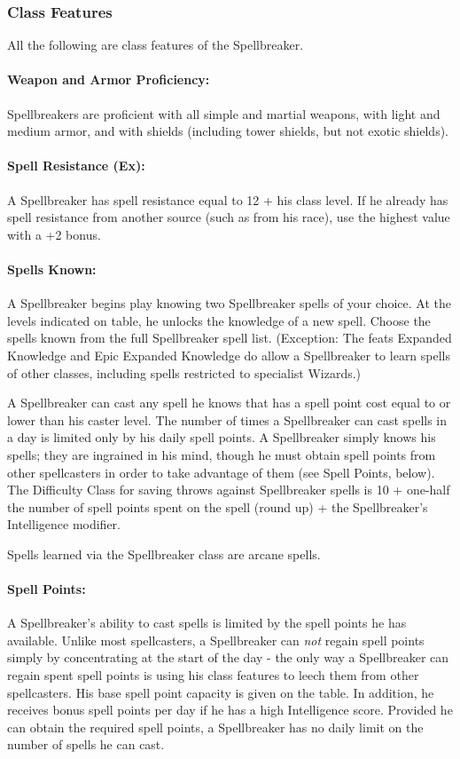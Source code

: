 \subsubsection{Class Features}
All the following are class features of the Spellbreaker.

\paragraph{Weapon and Armor Proficiency:} 
Spellbreakers are proficient with all simple and martial weapons, with light and medium armor, and with shields (including tower shields, but not exotic shields).

\paragraph{Spell Resistance (Ex):} A Spellbreaker has spell resistance equal to 12 + his class level. If he already has spell resistance from another source (such as from his race), use the highest value with a +2 bonus.

\paragraph{Spells Known:} A Spellbreaker begins play knowing two Spellbreaker spells of your choice.
At the levels indicated on  table, he unlocks the knowledge of a new spell.
Choose the spells known from the full Spellbreaker spell list.
(Exception: The feats Expanded Knowledge and Epic Expanded Knowledge do allow a Spellbreaker to learn spells of other classes, including spells restricted to specialist Wizards.) 

A Spellbreaker can cast any spell he knows that has a spell point cost equal to or lower than his caster level.
The number of times a Spellbreaker can cast spells in a day is limited only by his daily spell points. 
A Spellbreaker simply knows his spells; they are ingrained in his mind, though he must obtain spell points from other spellcasters in order to take advantage of them (see Spell Points, below).
The Difficulty Class for saving throws against Spellbreaker spells is 10 + one-half the number of spell points spent on the spell (round up) + the Spellbreaker's Intelligence modifier.

Spells learned via the Spellbreaker class are arcane spells.
\paragraph{Spell Points:} A Spellbreaker's ability to cast spells is limited by the spell points he has available. 
Unlike most spellcasters, a Spellbreaker can \emph{not} regain spell points simply by concentrating at the start of the day - the only way a Spellbreaker can regain spent spell points is using his class features to leech them from other spellcasters.
His base spell point capacity is given on the  table. In addition, he receives bonus spell points per day if he has a high Intelligence score.
Provided he can obtain the required spell points, a Spellbreaker has no daily limit on the number of spells he can cast.

